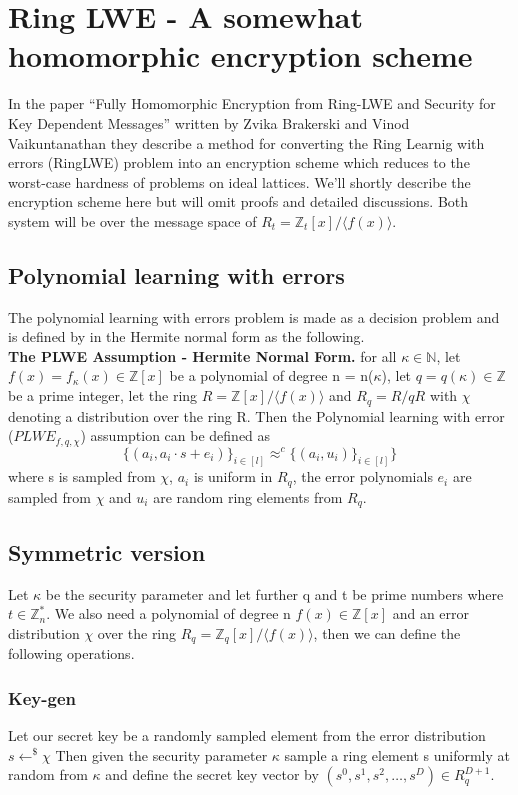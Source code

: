 \documentclass[../main.tex]{subfiles}
\begin{document}
\section{Ring LWE - A somewhat homomorphic encryption scheme} \label{section: RLWE theory}
In the paper ``Fully Homomorphic Encryption from Ring-LWE and Security for Key Dependent Messages'' written by
Zvika Brakerski and Vinod Vaikuntanathan \cite{brakerski2011fully}
they describe a method for converting the Ring Learnig with errors (RingLWE) problem into an encryption scheme
which reduces to the worst-case hardness of problems on ideal lattices.
We'll shortly describe the encryption scheme here but will omit proofs and detailed discussions.
Both system will be over the message space of $R_t = \mathbb{Z}_t[x] / \langle f(x) \rangle $.

\subsection{Polynomial learning with errors}
The polynomial learning with errors problem is made as a decision problem
and is defined by in the Hermite normal form as the following.
\\[2mm]
\textbf{The PLWE Assumption - Hermite Normal Form.}
for all $\kappa \in \mathbb{N}$, let $f(x) = f_{\kappa}(x) \in \mathbb{Z}[x]$
be a polynomial of degree n = n($\kappa$), let $q = q(\kappa) \in \mathbb{Z}$
be a prime integer, let the ring $R = \mathbb{Z}[x] / \langle f(x) \rangle$
and $R_q = R / qR$ with $\chi$ denoting a distribution over the ring R.
Then the Polynomial learning with error ($PLWE_{f,q,\chi}$) assumption can be defined as
$$
    \{ (a_i, a_i \cdot s + e_i) \}_{i \in [l]} \approx^{c} \{(a_i, u_i) \}_{i \in [l]}\}
$$
where s is sampled from $\chi$, $a_i$ is uniform in $R_q$, the error polynomials
$e_i$ are sampled from $\chi$ and $u_i$ are random ring elements from $R_q$.

\subsection{Symmetric version}
Let $\kappa$ be the security parameter and let further q and t be prime numbers where $t \in \mathbb{Z}_n^*$.
We also need a polynomial of degree n $f(x) \in \mathbb{Z}[x]$ and an error distribution $\chi$ over the ring
$R_q = \mathbb{Z}_q[x] / \langle f(x) \rangle$, then we can define the following operations.

\subsubsection{Key-gen}
Let our secret key be a randomly sampled element from the error distribution $s \leftarrow^\$ \chi$
Then given the security parameter $\kappa$ sample a ring element s uniformly at random from $\kappa$ and define the
secret key vector by $(s^0, s^1, s^2, \dots, s^D) \in R_q^{D+1}$.
\end{document}
